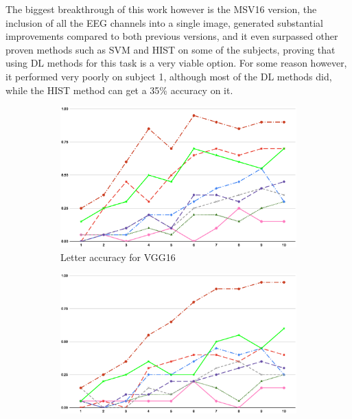 \documentclass[conference]{IEEEtran}
\begin{document}
The biggest breakthrough of this work however is the MSV16 version, the inclusion of all the EEG channels into a single image, generated substantial improvements compared to both previous versions, and it even surpassed other proven methods such as SVM and HIST on some of the subjects, proving that using DL methods for this task is a very viable option. For some reason however, it performed very poorly on subject 1, although most of the DL methods did, while the HIST method can get a 35\% accuracy on it.


\begin{figure}[h]
    \begin{subfigure}[t]{0.5\textwidth}
    \centering\captionsetup{width=.8\linewidth}
    \includegraphics[width=1\linewidth, keepaspectratio]{images/v1intensificationnolabel.eps}
    \caption{Letter accuracy for VGG16 \label{image:v1intensification2}}
    \end{subfigure}
    \begin{subfigure}[t]{0.5\textwidth}
    \centering\captionsetup{width=.8\linewidth}
    \includegraphics[width=1\linewidth, keepaspectratio]{images/v2intensificationnolabel.eps}

\end{subfigure}
\end{figure}
\end{document}
